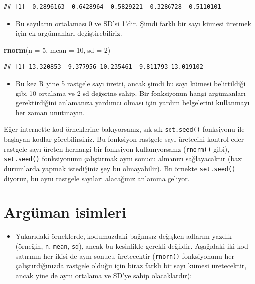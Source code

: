\documentclass[
  oneside]{book}
\newenvironment{Shaded}{\begin{snugshade}}{\end{snugshade}}
\newcommand{\AttributeTok}[1]{\textcolor[rgb]{0.13,0.29,0.53}{#1}}
\newcommand{\DecValTok}[1]{\textcolor[rgb]{0.00,0.00,0.81}{#1}}
\newcommand{\FunctionTok}[1]{\textcolor[rgb]{0.13,0.29,0.53}{\textbf{#1}}}
\newcommand{\NormalTok}[1]{#1}
\providecommand{\tightlist}{%
  \setlength{\itemsep}{0pt}\setlength{\parskip}{0pt}}
\begin{document}
\begin{verbatim}
## [1] -0.2896163 -0.6428964  0.5829221 -0.3286728 -0.5110101
\end{verbatim}

\begin{itemize}
\tightlist
\item
  Bu sayıların ortalaması 0 ve SD'si 1'dir. Şimdi farklı bir sayı kümesi üretmek için ek argümanları değiştirebiliriz.
\end{itemize}

\begin{Shaded}
\begin{Highlighting}[]
\FunctionTok{rnorm}\NormalTok{(}\AttributeTok{n =} \DecValTok{5}\NormalTok{, }\AttributeTok{mean =} \DecValTok{10}\NormalTok{, }\AttributeTok{sd =} \DecValTok{2}\NormalTok{)}
\end{Highlighting}
\end{Shaded}

\begin{verbatim}
## [1] 13.320853  9.377956 10.235461  9.811793 13.019102
\end{verbatim}

\begin{itemize}
\tightlist
\item
  Bu kez R yine 5 rastgele sayı üretti, ancak şimdi bu sayı kümesi belirtildiği gibi 10 ortalama ve 2 sd değerine sahip. Bir fonksiyonun hangi argümanları gerektirdiğini anlamanıza yardımcı olması için yardım belgelerini kullanmayı her zaman unutmayın.
\end{itemize}

\begin{info}
Eğer internette kod örneklerine bakıyorsanız, sık sık
\texttt{set.seed()} fonksiyonu ile başlayan kodlar görebilirsiniz. Bu
fonksiyon rastgele sayı üretecini kontrol eder - rastgele sayı üreten
herhangi bir fonksiyon kullanıyorsanız (\texttt{rnorm()} gibi),
\texttt{set.seed()} fonksiyonunu çalıştırmak aynı sonucu almanızı
sağlayacaktır (bazı durumlarda yapmak istediğiniz şey bu olmayabilir).
Bu örnekte \texttt{set.seed()} diyoruz, bu aynı rastgele sayıları
alacağınız anlamına geliyor.
\end{info}

\hypertarget{arguxfcman-isimleri}{%
\section{Argüman isimleri}\label{arguxfcman-isimleri}}

\begin{itemize}
\tightlist
\item
  Yukarıdaki örneklerde, kodumuzdaki bağımsız değişken adlarını yazdık (örneğin, \texttt{n}, \texttt{mean}, \texttt{sd}), ancak bu kesinlikle gerekli değildir. Aşağıdaki iki kod satırının her ikisi de aynı sonucu üretecektir (\texttt{rnorm()} fonksiyonunu her çalıştırdığınızda rastgele olduğu için biraz farklı bir sayı kümesi üretecektir, ancak yine de aynı ortalama ve SD'ye sahip olacaklardır):
\end{itemize}
\end{document}
